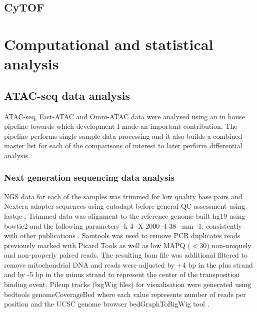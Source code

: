 \subsection{CyTOF}


\section{Computational and statistical analysis}

\subsection{ATAC-seq data analysis}
\label{ATAC_analysis}
ATAC-seq, Fast-ATAC and Omni-ATAC data were analysed using an in house pipeline towards which development I made an important contribution. The pipeline performs single sample data processing and it also builds a combined master list for each of the comparisons of interest to later perform differential analysis. 

\subsubsection{Next generation sequencing data analysis}
NGS data for each of the samples was trimmed for low quality base pairs and Nextera adapter sequences using cutadapt \parencite{} before general QC assessment using fastqc \parencite{}. Trimmed data was alignment to the reference genome built hg19 using bowtie2 \parencite{Langmead2006} and the following parameters -k 4 -X 2000 -I 38 --mm -1, consistently with other publications \parencite{Buenrostro2013, Corces2016}. Samtools \parencite{} was used to remove PCR duplicates reads previously marked with Picard Tools \parencite{} as well as low MAPQ (${<}$30) non-uniquely and non-properly paired reads. The resulting bam file was additional filtered to remove mitochondrial DNA and reads were adjusted by +4 bp in the plus strand and by -5 bp in the minus strand to represent the center of the transposition binding event. Pileup tracks (bigWig files) for visualisation were generated using bedtools genomeCoverageBed where each value represents number of reads per position \parencite{} and the UCSC genome browser bedGraphToBigWig tool \parencite{}.  

